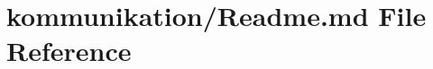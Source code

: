\hypertarget{kommunikation_2_readme_8md}{}\section{kommunikation/\+Readme.md File Reference}
\label{kommunikation_2_readme_8md}
